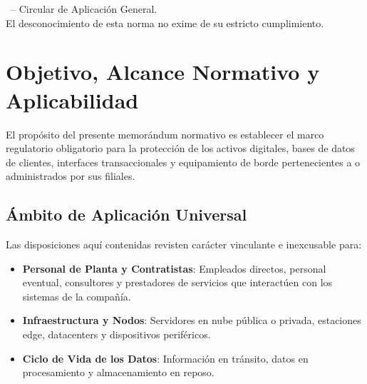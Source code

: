 \documentclass[11pt,letterpaper]{article}
\begin{document}
\vfill

\noindent\begin{minipage}[b]{0.65\textwidth}
  {\fontsize{7.5}{9}\selectfont\color{corpTextMuted}\corporatebrandlegal\ -- Circular de Aplicaci\'on General.\\[1pt]
  El desconocimiento de esta norma no exime de su estricto cumplimiento.}
\end{minipage}\hfill
\begin{minipage}[b]{0.30\textwidth}
  \raggedleft
  \drawchromaticbar[3pt]
\end{minipage}

\newpage


\section{Objetivo, Alcance Normativo y Aplicabilidad}

El prop\'osito del presente memor\'andum normativo es establecer el marco regulatorio obligatorio para la protecci\'on de los activos digitales, bases de datos de clientes, interfaces transaccionales y equipamiento de borde pertenecientes a \textbf{\corporatebrandlegal} o administrados por sus filiales.

\subsection{\'Ambito de Aplicaci\'on Universal}
Las disposiciones aqu\'i contenidas revisten car\'acter vinculante e inexcusable para:
\begin{itemize}[leftmargin=1.5em, itemsep=2pt, topsep=1pt]
  \item \textbf{Personal de Planta y Contratistas}: Empleados directos, personal eventual, consultores y prestadores de servicios que interact\'uen con los sistemas de la compa\~n\'ia.
  \item \textbf{Infraestructura y Nodos}: Servidores en nube p\'ublica o privada, estaciones edge, datacenters y dispositivos perif\'ericos.
  \item \textbf{Ciclo de Vida de los Datos}: Informaci\'on en tr\'ansito, datos en procesamiento y almacenamiento en reposo.
\end{itemize}
\end{document}
